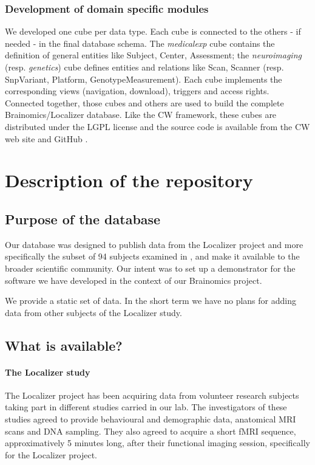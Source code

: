\documentclass[review]{elsarticle}
\begin{document}
\subsubsection{Development of domain specific modules}

We developed one cube per data type. Each cube is connected to the others - if needed - in the final database schema. The \textit{medicalexp} cube contains the definition of general entities like Subject, Center, Assessment; the \textit{neuroimaging} (resp. \textit{genetics}) cube defines entities and relations like Scan, Scanner (resp. SnpVariant, Platform, GenotypeMeasurement). Each cube implements the corresponding views (navigation, download), triggers and access rights. Connected together, those cubes and others are used to build the complete Brainomics/Localizer database. Like the CW framework, these cubes are distributed under the LGPL license and the source code is available from the CW web site \cite{CubicWeb} and GitHub \cite{Localizer}.


\section{Description of the repository}

\subsection{Purpose of the database}

Our database was designed to publish data from the Localizer project \cite{Pinel2007} and more specifically the subset of 94 subjects examined in \cite{Pinel2012}, and make it available to the broader scientific community. Our intent was to set up a demonstrator for the software we have developed in the context of our Brainomics project.

We provide a static set of data. In the short term we have no plans for adding data from other subjects of the Localizer study.


\subsection{What is available?}

\paragraph{The Localizer study} The Localizer project has been acquiring data from volunteer research subjects taking part in different studies carried in our lab. The investigators of these studies agreed to provide behavioural and demographic data, anatomical MRI scans and DNA sampling. They also agreed to acquire a short fMRI sequence, approximatively 5 minutes long, after their functional imaging session, specifically for the Localizer project.
\end{document}
